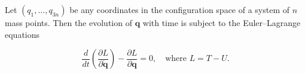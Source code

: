 Let $(q_1, \ldots, q_{3n})$ be any coordinates in the configuration space of a system of $n$ mass points. Then the evolution of $\mathbf{q}$ with time is subject to the Euler–Lagrange equations

$$\frac{d}{dt} \left( \frac{\partial L}{\partial \dot{\mathbf{q}}} \right) - \frac{\partial L}{\partial \mathbf{q}} = 0, \quad \text{where } L = T - U.$$

